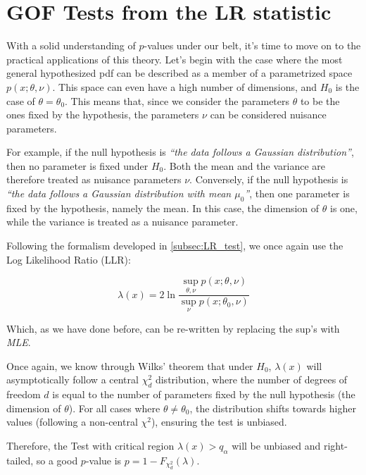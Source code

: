 \section{GOF Tests from the LR statistic}
With a solid understanding of $p$-values under our belt, it's time to move on to the practical applications of this theory. Let's begin with the case where the most general hypothesized pdf can be described as a member of a parametrized space $p(x;\theta, \nu)$. This space can even have a high number of dimensions, and $H_0$ is the case of $\theta=\theta_0$. This means that, since we consider the parameters $\theta$ to be the ones fixed by the hypothesis, the parameters $\nu$ can be considered nuisance parameters.

For example, if the null hypothesis is \textit{“the data follows a Gaussian distribution”}, then no parameter is fixed under $H_0$. Both the mean and the variance are therefore treated as nuisance parameters $\nu$.
Conversely, if the null hypothesis is \textit{“the data follows a Gaussian distribution with mean $\mu_0$”}, then one parameter is fixed by the hypothesis, namely the mean. In this case, the dimension of $\theta$ is one, while the variance is treated as a nuisance parameter.

Following the formalism developed in \ref{subsec:LR_test}, we once again use the Log Likelihood Ratio (LLR):

	\[
	\lambda(x) = 2\ln \frac{\sup_{\theta,\nu}p(x;\theta,\nu)}{\sup_{\nu}p(x;\theta_0,\nu)}
	\]

Which, as we have done before, can be re-written by replacing the sup's with \emph{MLE}.

Once again, we know through Wilks' theorem that under $H_0$, $\lambda(x)$ will asymptotically follow a central $\chi^2_d$ distribution, where the number of degrees of freedom $d$ is equal to the number of parameters fixed by the null hypothesis (the dimension of $\theta$). For all cases where $\theta \neq \theta_0$, the distribution shifts towards higher values (following a non-central $\chi^2$), ensuring the test is unbiased.

Therefore, the Test with critical region $\lambda(x)>q_\alpha$ will be unbiased and right-tailed, so a good $p$-value is $p=1-F_{\chi^2_d}(\lambda)$. 

